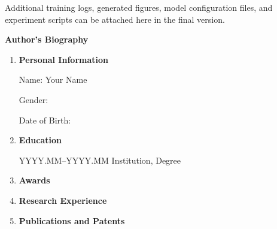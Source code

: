 \documentclass[12pt,a4paper]{report}
\newcommand{\StudentName}{Your Name}
\newcommand{\fronttitle}[1]{%
  \clearpage
  \begin{center}
    {\bfseries\fontsize{24}{28}\selectfont #1}
  \end{center}
  \vspace{1em}
}
\begin{document}
Additional training logs, generated figures, model configuration files, and experiment scripts can be attached here in the final version.

\fronttitle{Author's Biography}
\onehalfspacing

\begin{enumerate}[leftmargin=*,label=\arabic*.]
\item \textbf{Personal Information}

Name: \StudentName

Gender:

Date of Birth:

\item \textbf{Education}

YYYY.MM--YYYY.MM \quad Institution, Degree

\item \textbf{Awards}

\item \textbf{Research Experience}

\item \textbf{Publications and Patents}
\end{enumerate}
\doublespacing
\end{document}
